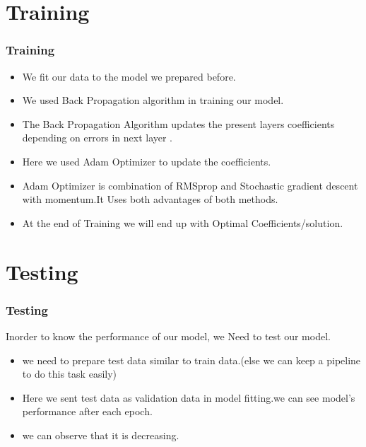 \documentclass{beamer}
\begin{document}

\section{Training}
\begin{frame}
\frametitle{Training}



\begin{itemize}
    \item<1-> We fit our data to the model we prepared before.
    \item<2-> We used Back Propagation algorithm in training our model. 
    \item<3-> The Back Propagation Algorithm updates the present layers coefficients depending on errors in next layer .
    \item<4-> Here we used Adam Optimizer to update the coefficients.
    \item<5-> Adam Optimizer is combination of RMSprop and Stochastic gradient descent with momentum.It Uses both advantages of both methods.
    \item<6-> At the end of Training we will end up with Optimal Coefficients/solution.
    
\end{itemize}
\end{frame}



\section{Testing}


\begin{frame}
\frametitle{Testing}


Inorder to know the performance of our model, we Need to test our model.

\begin{itemize}
    \item<1-> we need to prepare test data similar to train data.(else we can keep a pipeline to do this task easily)
    \item<2-> Here we sent test data as validation data in model fitting.we can see model's performance after each epoch.
    \item<3-> we can observe that it is decreasing.
\end{itemize}
\end{frame}
\end{document}
